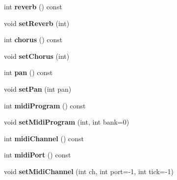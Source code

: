 \begin{DoxyCompactItemize}
\item 
\mbox{\label{class_ms_1_1_part_ae7f8340de9aeda2af781d0bafb6b3bb4}} 
int {\bfseries reverb} () const
\item 
\mbox{\label{class_ms_1_1_part_a7013bbfd145eb87d89a6cb82822231ef}} 
void {\bfseries set\+Reverb} (int)
\item 
\mbox{\label{class_ms_1_1_part_af13b678714f516679c8a2bd05649225a}} 
int {\bfseries chorus} () const
\item 
\mbox{\label{class_ms_1_1_part_a6628bad6bd53d4447df0d81f9ad884f9}} 
void {\bfseries set\+Chorus} (int)
\item 
\mbox{\label{class_ms_1_1_part_ab7987b07df54757ccf8483e1eb089c5a}} 
int {\bfseries pan} () const
\item 
\mbox{\label{class_ms_1_1_part_a121ec8da97c84813e59ab34b5645e029}} 
void {\bfseries set\+Pan} (int pan)
\item 
\mbox{\label{class_ms_1_1_part_a196ff7c4335a5a486f12f97c4d54914b}} 
int {\bfseries midi\+Program} () const
\item 
\mbox{\label{class_ms_1_1_part_a289630faf54df5f562c472c8bbfe4a29}} 
void {\bfseries set\+Midi\+Program} (int, int bank=0)
\item 
\mbox{\label{class_ms_1_1_part_afd2e6236a2abfd44b877f87b1676b806}} 
int {\bfseries midi\+Channel} () const
\item 
\mbox{\label{class_ms_1_1_part_a1896e0bcc7706a1ebd959da4ea485b10}} 
int {\bfseries midi\+Port} () const
\item 
\mbox{\label{class_ms_1_1_part_a11dc748b4bc72e7e1fb28231bfb83f22}} 
void {\bfseries set\+Midi\+Channel} (int ch, int port=-\/1, int tick=-\/1)
\item 
\mbox{\label{class_ms_1_1_part_a59495f5c2fc1a139f6597d9402a63a5f}} 

\end{DoxyCompactItemize}
